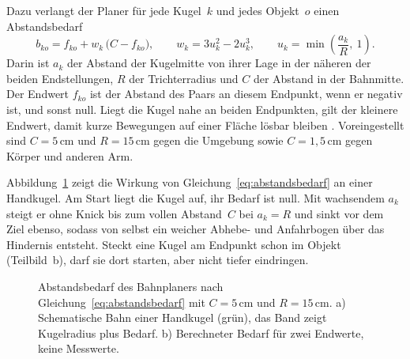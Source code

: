 Dazu verlangt der Planer für jede Kugel~$k$ und jedes Objekt~$o$ einen Abstandsbedarf
\begin{equation}
  b_{ko} = f_{ko} + w_k\,\bigl(C - f_{ko}\bigr), \qquad
  w_k = 3u_k^2 - 2u_k^3, \qquad
  u_k = \min\left(\frac{a_k}{R},\ 1\right).
  \label{eq:abstandsbedarf}
\end{equation}
%
Darin ist $a_k$ der Abstand der Kugelmitte von ihrer Lage in der näheren der beiden Endstellungen, $R$ der Trichterradius und $C$ der Abstand in der Bahnmitte.
Der Endwert $f_{ko}$ ist der Abstand des Paars an diesem Endpunkt, wenn er negativ ist, und sonst null.
Liegt die Kugel nahe an beiden Endpunkten, gilt der kleinere Endwert, damit kurze Bewegungen auf einer Fläche lösbar bleiben .
Voreingestellt sind $C = 5$\,cm und $R = 15$\,cm gegen die Umgebung sowie $C = 1{,}5$\,cm gegen Körper und anderen Arm.

Abbildung~\ref{fig:trichter} zeigt die Wirkung von Gleichung~\ref{eq:abstandsbedarf} an einer Handkugel.
Am Start liegt die Kugel auf, ihr Bedarf ist null.
Mit wachsendem $a_k$ steigt er ohne Knick bis zum vollen Abstand~$C$ bei $a_k = R$ und sinkt vor dem Ziel ebenso, sodass von selbst ein weicher Abhebe- und Anfahrbogen über das Hindernis entsteht.
Steckt eine Kugel am Endpunkt schon im Objekt (Teilbild~b), darf sie dort starten, aber nicht tiefer eindringen.

\begin{figure}[htbp]
  \centering
  
  \caption[Trichter des Bahnplaners]{Abstandsbedarf des Bahnplaners nach Gleichung~\ref{eq:abstandsbedarf} mit $C = 5$\,cm und $R = 15$\,cm. a) Schematische Bahn einer Handkugel (grün), das Band zeigt Kugelradius plus Bedarf. b) Berechneter Bedarf für zwei Endwerte, keine Messwerte.}
  \label{fig:trichter}
\end{figure}

